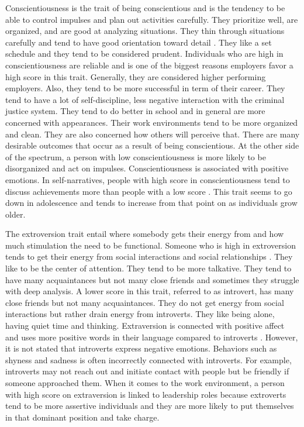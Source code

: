 Conscientiousness is the trait of being conscientious and is the tendency to be able to control impulses and plan out activities carefully. They prioritize well, are organized, and are good at analyzing situations. They thin through situations carefully and tend to have good orientation toward detail \cite{big-five-john1999big}. They like a set schedule and they tend to be considered prudent. Individuals who are high in conscientiousness are reliable and is one of the biggest reasons employers favor a high score in this trait. Generally, they are considered higher performing employers. Also, they tend to be more successful in term of their career. They tend to have a lot of self-discipline, less negative interaction with the criminal justice system. They tend to do better in school and in general are more concerned with appearances. Their work environments tend to be more organized and clean. They are also concerned how others will perceive that. There are many desirable outcomes that occur as a result of being conscientious. At the other side of the spectrum, a person with low conscientiousness is more likely to be disorganized and act on impulses. Conscientiousness is associated with positive emotions. In self-narratives, people with high score in conscientiousness tend to discuss achievements more than people with a low score \cite{conscientiousness1-HIRSH2009524}. This trait seems to go down in adolescence and tends to increase from that point on as individuals grow older. 

The extroversion trait entail where somebody gets their energy from and how much stimulation the need to be functional. Someone who is high in extroversion tends to get their energy from social interactions and social relationships \cite{big-five-john1999big}. They like to be the center of attention. They tend to be more talkative. They tend to have many acquaintances but not many close friends and sometimes they struggle with deep analysis. A lower score in this trait, referred to as introvert, has many close friends but not many acquaintances. They do not get energy from social interactions but rather drain energy from introverts. They like being alone, having quiet time and thinking. Extraversion is connected with positive affect and uses more positive words in their language compared to introverts \cite{extraversion1-komulainen2014effect} \cite{extraversion2-pennebaker1999linguistic}. However, it is not stated that introverts express negative emotions. Behaviors such as shyness and sadness is often incorrectly connected with introverts. For example, introverts may not reach out and initiate contact with people but be friendly if someone approached them. When it comes to the work environment, a person with high score on extraversion is linked to leadership roles because extroverts tend to be more assertive individuals and they are more likely to put themselves in that dominant position and take charge.  

